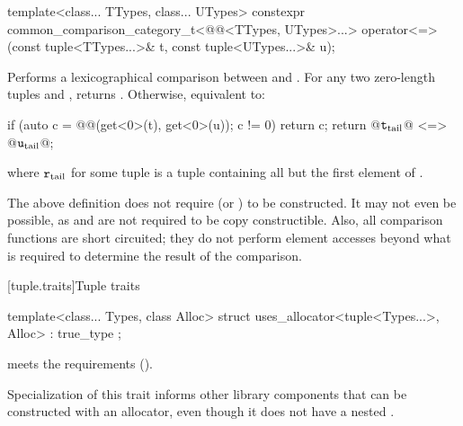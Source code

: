 %
\begin{itemdecl}
template<class... TTypes, class... UTypes>
  constexpr common_comparison_category_t<@@<TTypes, UTypes>...>
    operator<=>(const tuple<TTypes...>& t, const tuple<UTypes...>& u);
\end{itemdecl}

\begin{itemdescr}
\pnum
\effects
Performs a lexicographical comparison between  and .
For any two zero-length tuples  and ,
 returns .
Otherwise, equivalent to:
\begin{codeblock}
if (auto c = @@(get<0>(t), get<0>(u)); c != 0) return c;
return @$\texttt{t}_\mathrm{tail}$@ <=> @$\texttt{u}_\mathrm{tail}$@;
\end{codeblock}
where $\texttt{r}_\mathrm{tail}$ for some tuple 
is a tuple containing all but the first element of .
\end{itemdescr}

\pnum
\begin{note}
The above definition does not require 
(or ) to be constructed. It may not
even be possible, as  and  are not required to be copy
constructible. Also, all comparison functions are short circuited;
they do not perform element accesses beyond what is required to determine the
result of the comparison.
\end{note}

[tuple.traits]{Tuple traits}

%
\begin{itemdecl}
template<class... Types, class Alloc>
  struct uses_allocator<tuple<Types...>, Alloc> : true_type { };
\end{itemdecl}

\begin{itemdescr}
\pnum
\expects
{} meets the 
requirements ().

\pnum
\begin{note}
Specialization of this trait informs other library components that
 can be constructed with an allocator, even though it does not have
a nested .
\end{note}
\end{itemdescr}

